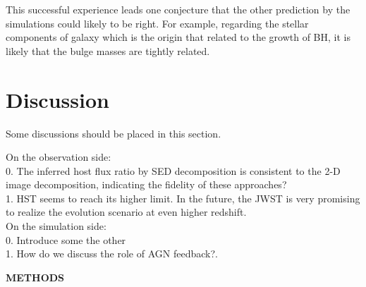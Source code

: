 \documentclass{natureprintstyle}
\newcommand{\hst}{{\it HST}}
\newcommand{\mbh}{$\mathcal M_{\rm BH}$}
\newcommand{\halpha}{${\it H}\alpha$}
\newcommand{\hbeta}{${\it H}\beta$}
\newcommand{\Mgii}{Mg$_{\rm II}$}
\newcommand{\Civ}{C$_{\rm IV}$}
\begin{document}
This successful experience leads one conjecture that the other prediction by the simulations could likely to be right. For example, regarding the stellar components of galaxy which is the origin that related to the growth of BH, it is likely that the bulge masses are tightly related.

\section{Discussion}
Some discussions should be placed in this section.

On the observation side:\\
0. The inferred host flux ratio by SED decomposition is consistent to the 2-D image decomposition, indicating the fidelity of these approaches?\\
1. HST seems to reach its higher limit. In the future, the JWST is very promising to realize the evolution scenario at even higher redshift.\\


On the simulation side:
\\0. Introduce some the other 
\\1. How do we discuss the role of AGN feedback?.

\clearpage
\newpage

\begin{center}
{\bf \Large \uppercase{Methods} }
\end{center}

\end{document}
